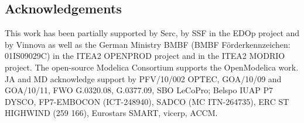 \subsection*{Acknowledgements}
\label{sec:optimizationacknowledgements}

This work has been partially supported by Serc, by SSF in the EDOp project and by Vinnova as well as the German
Ministry BMBF (BMBF F\"{o}rderkennzeichen: 01IS09029C) in the ITEA2 OPENPROD project and in the ITEA2 MODRIO
project. The open-source Modelica Consortium supports the OpenModelica work.
JA and MD acknowledge support by PFV/10/002 OPTEC, GOA/10/09 and GOA/10/11, FWO G.0320.08, G.0377.09,
SBO LeCoPro; Belspo IUAP P7 DYSCO, FP7-EMBOCON (ICT-248940), SADCO (MC ITN-264735),
ERC ST HIGHWIND (259 166), Eurostars SMART, vicerp, ACCM.






